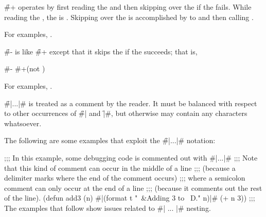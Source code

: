 \f{\#+} operates by first reading the 
and then skipping over the  if the  fails.
While reading the , the  is .
Skipping over the  is accomplished by  
 to  and then calling .

For examples, \seesection\FeatureExpExamples.

\endsubsubsection%



\f{\#-} is like \f{\#+} 
except that it skips the  if the  succeeds; 
that is,

\code
#-  \EQ #+(not ) 
\endcode

For examples, \seesection\FeatureExpExamples.

\endsubsubsection%



\f{\#|...|\#} is treated as a comment by the reader.
It must be balanced with respect to other occurrences of \f{\#|} and \f{|\#},
but otherwise may contain any characters whatsoever.


The following are some examples that exploit the \f{\#|...|\#} notation:

\code
;;; In this example, some debugging code is commented out with #|...|#
;;; Note that this kind of comment can occur in the middle of a line
;;; (because a delimiter marks where the end of the comment occurs)
;;; where a semicolon comment can only occur at the end of a line 
;;; (because it comments out the rest of the line).
 (defun add3 (n) #|(format t "~&Adding 3 to ~D." n)|# (+ n 3))
\goodbreak
;;; The examples that follow show issues related to #| ... |# nesting.

